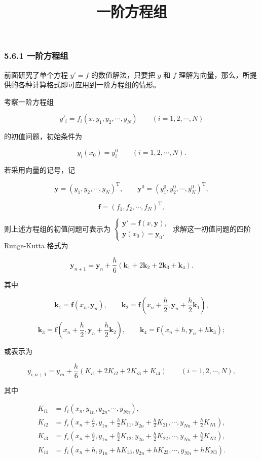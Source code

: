 \documentclass[
  10pt,
  fontset=fandol]{ctexart}
\title{一阶方程组}
\author{}
\date{}
\begin{document}
\maketitle

\subsubsection{5.6.1 一阶方程组}\label{ux4e00ux9636ux65b9ux7a0bux7ec4}

前面研究了单个方程 \(y'=f\) 的数值解法，只要把 \(y\) 和 \(f\) 理解为向量，那么，所提供的各种计算格式即可应用到一阶方程组的情形。

考察一阶方程组

\[
y'_i=f_i(x,y_1,y_2,\cdots,y_N)\qquad(i=1,2,\cdots,N)
\]

的初值问题，初始条件为

\[
y_i(x_0)=y_i^0\qquad(i=1,2,\cdots,N).
\]

若采用向量的记号，记

\[
\boldsymbol y=(y_1,y_2,\cdots,y_N)^{\mathrm T},\qquad
\boldsymbol y^0=(y_1^0,y_2^0,\cdots,y_N^0)^{\mathrm T},
\]

\[
\boldsymbol f=(f_1,f_2,\cdots,f_N)^{\mathrm T},
\]

则上述方程组的初值问题可表示为 \(\begin{cases}\boldsymbol y'=\boldsymbol f(x,\boldsymbol y),\\\boldsymbol y(x_0)=\boldsymbol y_0.\end{cases}\) 求解这一初值问题的四阶 Runge-Kutta 格式为

\[
\boldsymbol y_{n+1}=\boldsymbol y_n+\frac h6(\boldsymbol k_1+2\boldsymbol k_2+2\boldsymbol k_3+\boldsymbol k_4).
\]

其中

\[
\boldsymbol k_1=\boldsymbol f(x_n,\boldsymbol y_n),\qquad
\boldsymbol k_2=\boldsymbol f\left(x_n+\frac h2,\boldsymbol y_n+\frac h2\boldsymbol k_1\right),
\]

\[
\boldsymbol k_3=\boldsymbol f\left(x_n+\frac h2,\boldsymbol y_n+\frac h2\boldsymbol k_2\right),\qquad
\boldsymbol k_4=\boldsymbol f(x_n+h,\boldsymbol y_n+h\boldsymbol k_3);
\]

或表示为

\[
y_{i,n+1}=y_{in}+\frac h6(K_{i1}+2K_{i2}+2K_{i3}+K_{i4})\qquad(i=1,2,\cdots,N),
\]

其中

\[
\begin{aligned}
K_{i1}&=f_i(x_n,y_{1n},y_{2n},\cdots,y_{Nn}),\\
K_{i2}&=f_i\left(x_n+\frac h2,y_{1n}+\frac h2K_{11},y_{2n}+\frac h2K_{21},\cdots,y_{Nn}+\frac h2K_{N1}\right),\\
K_{i3}&=f_i\left(x_n+\frac h2,y_{1n}+\frac h2K_{12},y_{2n}+\frac h2K_{22},\cdots,y_{Nn}+\frac h2K_{N2}\right),\\
K_{i4}&=f_i(x_n+h,y_{1n}+hK_{13},y_{2n}+hK_{23},\cdots,y_{Nn}+hK_{N3}).
\end{aligned}
\]
\end{document}
